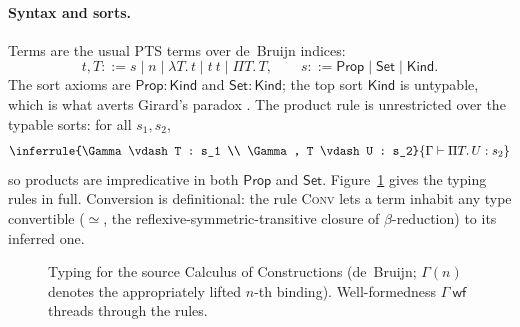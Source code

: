 \documentclass[acmsmall,anonymous=false,nonacm]{acmart}
\newcommand{\Prop}{\ensuremath{\mathsf{Prop}}}
\newcommand{\Set}{\ensuremath{\mathsf{Set}}}
\newcommand{\Kind}{\ensuremath{\mathsf{Kind}}}
\newcommand{\conv}{\simeq}
\newcommand{\hastype}[3]{#1 \vdash #2 : #3}
\newcommand{\wf}[1]{#1\ \mathsf{wf}}
\begin{document}
\paragraph{Syntax and sorts.}
Terms are the usual PTS terms over de~Bruijn indices:
\[
t, T ::= s \mid n \mid \lambda T.\,t \mid t\ t \mid \Pi T.\,T,
\qquad
s ::= \Prop \mid \Set \mid \Kind.
\]
The sort axioms are $\Prop : \Kind$ and $\Set : \Kind$; the top sort $\Kind$ is
untypable, which is what averts Girard's paradox \cite{girard1972}. The product
rule is unrestricted over the typable sorts: for all $s_1, s_2$,
\[
\inferrule{\hastype{\Gamma}{T}{s_1} \\ \hastype{\Gamma, T}{U}{s_2}}
          {\hastype{\Gamma}{\Pi T.\,U}{s_2}}
\]
so products are impredicative in both $\Prop$ and $\Set$. Figure~\ref{fig:coc}
gives the typing rules in full. Conversion is definitional: the rule
\textsc{Conv} lets a term inhabit any type convertible ($\conv$, the
reflexive-symmetric-transitive closure of $\beta$-reduction) to its inferred one.

\begin{figure}
\small
{}
\caption{Typing for the source Calculus of Constructions (de~Bruijn; $\Gamma(n)$
denotes the appropriately lifted $n$-th binding). Well-formedness $\wf{\Gamma}$
threads through the rules.}
\label{fig:coc}
\end{figure}
\end{document}
